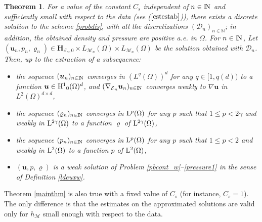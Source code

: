 \documentclass{amsart}
\newtheorem{thm}{Theorem}
\numberwithin{equation}{section}
\begin{document}
\begin{thm}
For a value of the constant ${C_s}$ independent of ${{n \in {\ifmmode{\rm	I\mkern-3.1mu
N\mkern0.5mu}\else{\rm I\kern-.16em
N\hskip0.5pt\ }\fi\relax}}}$ and sufficiently small with respect to the data (see ($\ref{cstestab}$)), there exists a discrete solution to the scheme \eqref{probdis}, with all the discretizations $({{\mathcal D}}_n)_{n\in {\mathbb{N}}}$; in addition, the obtained density and pressure are positive a.e. in $\Omega$.
For ${{n \in {\ifmmode{\rm	I\mkern-3.1mu
N\mkern0.5mu}\else{\rm I\kern-.16em
N\hskip0.5pt\ }\fi\relax}}}$, Let $({\bm{u}}_n,p_n,{\varrho}_n) \in  {{\mathbf{H}_{{{\mathcal E}}_n,0}}} \times L_{{{\mathcal M}}_n}(\Omega) \times L_{{{\mathcal M}}_n} (\Omega) $ be the solution obtained with ${{\mathcal D}}_n$.
Then, up to the extraction of a subsequence:
\begin{itemize}
\item the sequence $({{\boldsymbol u}}_n)_{{n \in {\ifmmode{\rm	I\mkern-3.1mu
N\mkern0.5mu}\else{\rm I\kern-.16em
N\hskip0.5pt\ }\fi\relax}}}$ converges in $(L^q(\Omega))^d$ for any $q \in [1,q(d))$ to  a function ${{\boldsymbol u}} \in {{\rm H}^{1}}_0(\Omega)^d$, and $(\nabla_{\operatorname{{\mathcal{E}}}_n} {\bm{u}}_n)_{{n \in {\ifmmode{\rm	I\mkern-3.1mu
N\mkern0.5mu}\else{\rm I\kern-.16em
N\hskip0.5pt\ }\fi\relax}}} $ converges weakly to $\nabla {\bm{u}} $ in $L^2(\Omega)^{d \times d} $,
\item the sequence $({\varrho}_n)_{{n \in {\ifmmode{\rm	I\mkern-3.1mu
N\mkern0.5mu}\else{\rm I\kern-.16em
N\hskip0.5pt\ }\fi\relax}}}$ converges in ${{\rm L}}^{p}(\Omega)$ for any $p$ such that $1 \leq p < 2 \gamma$ and weakly in ${{\rm L}}^{2\gamma}(\Omega)$ to a function ${\varrho}$ of ${{\rm L}}^{2\gamma}(\Omega)$,
\item the sequence $(p_n)_{{n \in {\ifmmode{\rm	I\mkern-3.1mu
N\mkern0.5mu}\else{\rm I\kern-.16em
N\hskip0.5pt\ }\fi\relax}}}$ converges in ${{\rm L}}^{p}(\Omega)$ for any $p$ such that $1 \leq p < 2$ and weakly in ${{\rm L}^{2}}(\Omega)$ to a function $p$ of  ${{\rm L}^{2}}(\Omega)$,
\item $({\bm{u}},p,{\varrho})$ is a weak solution of Problem \eqref{pbcont_w}--\eqref{pressure1}   in the sense of Definition \ref{ldeuxw}.
\end{itemize}
\label{theo:conv1}
\end{thm}
Theorem \ref{mainthm} is also true with a fixed value of $C_s$ (for instance, $C_s=1$). The only difference is that the estimates on the
approximated solutions are valid only for $h_{{\mathcal M}}$ small enough with respect to the data.
\end{document}
